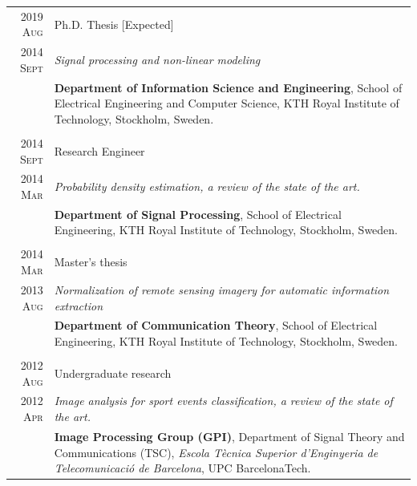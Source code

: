 \documentclass[a4paper,10pt]{article}
\begin{document}
    \begin{tabular}{r|p{13cm}}
    
      \textsc{2019 Aug} 	& Ph.D. Thesis [Expected] \\
      \textsc{2014 Sept} 	& \emph{Signal processing and non-linear modeling} \\
				& \footnotesize{ \textbf{Department of Information Science and Engineering}, School of Electrical Engineering and Computer Science,
				  KTH Royal Institute of Technology, Stockholm, Sweden.} \\
      \multicolumn{2}{c}{} \\

      \textsc{2014 Sept} 	& Research Engineer \\
      \textsc{2014 Mar} 	& \emph{Probability density estimation, a review of the state of the art.} \\ 
				& \footnotesize{ \textbf{Department of Signal Processing}, School of Electrical Engineering,
				  KTH Royal Institute of Technology, Stockholm, Sweden.} \\
      \multicolumn{2}{c}{} \\

      \textsc{2014 Mar} 	& Master's thesis \\
      \textsc{2013 Aug} 	& \emph{ Normalization of remote sensing imagery for automatic information extraction } \\ 
				& \footnotesize{ \textbf{Department of Communication Theory}, School of Electrical Engineering,
				  KTH Royal Institute of Technology, Stockholm, Sweden.} \\
      \multicolumn{2}{c}{} \\


      \textsc{2012 Aug} 	& Undergraduate research \\
      \textsc{2012 Apr} 	& \emph{Image analysis for sport events classification, a review of the state of the art.} \\ 
				& \footnotesize{ \textbf{Image Processing Group (GPI)}, Department of Signal Theory and 
				  Communications (TSC), \emph{Escola T\`{e}cnica Superior d'Enginyeria de Telecomunicaci\'{o} 
				  de Barcelona}, UPC BarcelonaTech.} \\

    \end{tabular}
\end{document}

